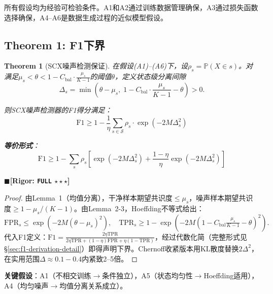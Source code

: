 \documentclass[12pt,a4paper]{ctexart}
\newtheorem{theorem}{Theorem}[section]
\theoremstyle{definition}
\theoremstyle{remark}
\newcommand{\rigorFull}{$\blacksquare$\;\textbf{[Rigor: \texttt{FULL} $\star\star\star$]}}
\begin{document}
所有假设均为经验可检验条件。A1和A2通过训练数据管理确保，A3通过损失函数选择确保，A4--A6是数据生成过程的近似模型假设。

\subsection{Theorem 1: F1下界}

\begin{theorem}[SCX噪声检测保证]
\label{thm:1}
在假设(A1)–(A6)下，设$\rho_s = \mathbb{P}(X \in s)$。对满足$\mu_s < \theta < 1 - C_{\text{bal}} \cdot \frac{\mu_s}{K-1}$的阈值$\theta$，定义状态级分离间隙
\begin{equation}
\Delta_s = \min\left(\theta - \mu_s, \; 1 - C_{\text{bal}} \cdot \frac{\mu_s}{K-1} - \theta\right) > 0.
\end{equation}

则SCX噪声检测器的F1得分满足：
\begin{equation}
\boxed{\mathrm{F1} \geq 1 - \frac{1}{\eta}\sum_{s \in \mathcal{S}} \rho_s \cdot \exp(-2M\Delta_s^2)}
\end{equation}

\textbf{等价形式}：
\begin{equation}
\mathrm{F1} \geq 1 - \sum_{s} \rho_s \left[\exp(-2M\Delta_s^2) + \frac{1-\eta}{\eta}\exp(-2M\Delta_s^2)\right]
\end{equation}
\end{theorem}
\rigorFull

\begin{proof}
由Lemma~1（均值分离），干净样本期望共识度$\leq \mu_s$，噪声样本期望共识度$\geq 1 - \mu_s/(K-1)$。由Lemma~2-3，Hoeffding不等式给出：
\begin{equation}
\mathrm{FPR}_s \leq \exp(-2M(\theta-\mu_s)^2), \quad \mathrm{TPR}_s \geq 1 - \exp(-2M(1-C_{\text{bal}}\tfrac{\mu_s}{K-1}-\theta)^2).
\end{equation}
代入F1定义：$\mathrm{F1} = \frac{2\eta\mathrm{TPR}}{2\eta\mathrm{TPR} + (1-\eta)\mathrm{FPR} + \eta(1-\mathrm{TPR})}$，经过代数化简（完整形式见\S\ref{sec:f1-derivation-detail}）即得声明下界。Chernoff收紧版本用$\mathrm{KL}$散度替换$2\Delta^2$，在实用范围$\Delta \approx 0.1-0.4$内紧致2--5倍。
\end{proof}

\noindent\textbf{关键假设}：A1（不相交训练$\to$条件独立），A5（状态均匀性$\to$Hoeffding适用），A4（均匀噪声$\to$均值分离关系成立）。
\end{document}
